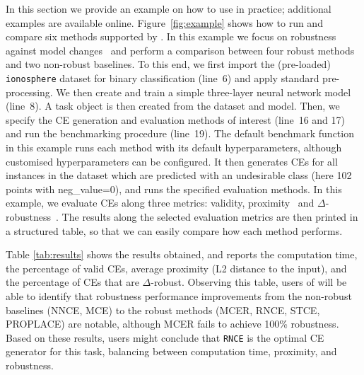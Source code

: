 In this section we provide an example on how to use \name{} in practice; additional examples are available online. Figure~\ref{fig:example} shows how to run and compare six methods supported by \name{}. In this example we focus on robustness against model changes~\cite{UpadhyayJL21} and perform a comparison between four robust methods and two non-robust baselines. To this end, we first import the (pre-loaded) \texttt{ionosphere} dataset for binary classification (line~6) and apply standard pre-processing. We then create and train a simple three-layer neural network model (line~8).
A task object is then created from the dataset and model. Then, we specify the CE generation and evaluation methods of interest (line~16 and 17) and run the benchmarking procedure (line~19). The default benchmark function in this example runs each method with its default hyperparameters, although customised hyperparameters can be configured. It then generates CEs for all instances in the dataset which are predicted with an undesirable class (here 102 points with neg\_value=0), and runs the specified evaluation methods. In this example, we evaluate CEs along three metrics: validity, proximity~\cite{Wachter17} and $\Delta$-robustness~\cite{JiangL0T23}. The results along the selected evaluation metrics are then printed in a structured table, so that 
we can easily compare how each method performs. 

Table \ref{tab:results} shows the results obtained, and reports the computation time, the percentage of valid CEs, average proximity (L2 distance to the input), and the percentage of CEs that are $\Delta$-robust. Observing this table, users of \name{} will be able to identify that robustness performance improvements from the non-robust baselines (NNCE, MCE) to the robust methods (MCER, RNCE, STCE, PROPLACE) are notable, although MCER fails to achieve 100\% robustness. Based on these results, users might conclude that \texttt{RNCE} is the optimal CE generator for this task, balancing between computation time, proximity, and robustness. 

